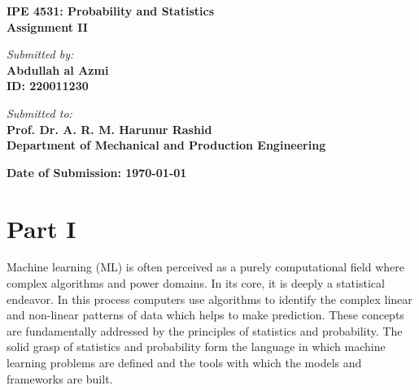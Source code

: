 \documentclass[12pt]{article}
\begin{document}
\begin{titlepage}
    \begin{center}
        \vspace*{2cm}
        {\Huge \textbf{ IPE 4531: Probability and Statistics}} \\
        \vspace{1cm}
        \Large{\textbf{Assignment II}} \\

        \vfill

        \textit{\large Submitted by:} \\
        \vspace{0.3cm}
        \textbf{Abdullah al Azmi} \\
        \textbf{ID: 220011230} \\

        \vfill

        \textit{\large Submitted to:} \\
        \vspace{0.3cm}
        \textbf{\Large Prof. Dr. A. R. M. Harunur Rashid} \\
        \textbf{Department of Mechanical and Production Engineering} \\

        \vfill

        \textbf{Date of Submission: \today}
        \vspace*{1cm}
    \end{center}
\end{titlepage}

\newpage

\section{Part I}

\begingroup

\setlength{\parindent}{0pt}
\setlength{\parskip}{0.8em}

Machine learning (ML) is often perceived as a purely computational field where complex algorithms and power domains. In its core, it is deeply a statistical endeavor. In this process computers use algorithms to identify the complex linear and non-linear patterns of data which helps to make prediction. These concepts are fundamentally addressed by the principles of statistics and probability. The solid grasp of statistics and probability form the language in which machine learning problems are defined and the tools with which the models and frameworks are built.
\end{document}
